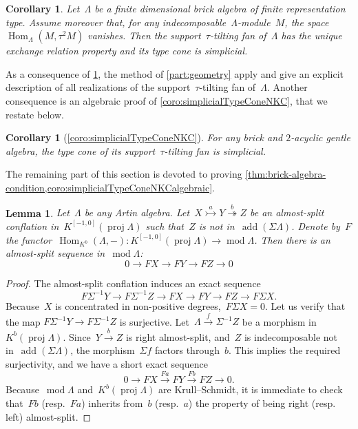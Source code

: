 \documentclass{amsart}
\newtheorem{corollary}[theorem]{Corollary}
\newtheorem{lemma}[theorem]{Lemma}
\theoremstyle{definition}
\newcommand{\Hom}[1]{\operatorname{Hom}_{#1}}
\newcommand{\susp}{\Sigma}
\newcommand{\add}{\operatorname{add}}
\newcommand{\MOD}{\operatorname{mod}}
\newcommand{\proj}{\operatorname{proj}}
\newcommand{\infl}{\rightarrowtail}
\newcommand{\defl}{\twoheadrightarrow}
\begin{document}
\begin{corollary}
\label{coro:silting simplicial}
Let~$\Lambda$ be a finite dimensional brick algebra of finite representation type.
Assume moreover that, for any indecomposable~$\Lambda$-module~$M$, the space~$\Hom{\Lambda}(M, \tau^2 M)$ vanishes.
Then the support~$\tau$-tilting fan of~$\Lambda$ has the unique exchange relation property and its type cone is simplicial.
\end{corollary}

As a consequence of \cref{coro:silting simplicial}, the method of \cref{part:geometry} apply and give an explicit description of all realizations of the support~$\tau$-tilting fan of~$\Lambda$.
Another consequence is an algebraic proof of \cref{coro:simplicialTypeConeNKC}, that we restate below.

\begin{corollary}[\cref{coro:simplicialTypeConeNKC}]
\label{coro:simplicialTypeConeNKCalgebraic}
For any brick and $2$-acyclic gentle algebra, the type cone of its support~$\tau$-tilting fan is simplicial.
\end{corollary}

The remaining part of this section is devoted to proving \cref{thm:brick-algebra-condition,coro:simplicialTypeConeNKCalgebraic}.

\begin{lemma}
\label{lem:AR-conflations-and-sequences}
Let~$\Lambda$ be any Artin algebra. Let~$X\overset{a}{\infl} Y \overset{b}{\defl} Z$ be an almost-split conflation in~$K^{[-1,0]}(\proj \Lambda)$ such that~$Z$ is not in~$\add(\susp \Lambda)$. Denote by~$F$ the functor~$\Hom{K^b}(\Lambda, -):K^{[-1,0]}(\proj \Lambda) \to \MOD \Lambda$. Then there is an almost-split sequence in~$\MOD\Lambda$:
\[
0\to FX\to FY \to FZ \to 0
\]
\end{lemma}

\begin{proof}
The almost-split conflation induces an exact sequence
\[
F\susp^{-1}Y\to F\susp^{-1}Z \to FX \to FY\to FZ\to F\susp X.
\]
Because~$X$ is concentrated in non-positive degrees,~$F\susp X=0$.
Let us verify that the map ${F\susp^{-1}Y\to F\susp^{-1}Z}$ is surjective.
Let~$\Lambda \xrightarrow{f} \susp^{-1} Z$ be a morphism in~$K^b(\proj \Lambda)$.
Since~$Y\overset{b}{\to} Z$ is right almost-split, and~$Z$ is indecomposable not in~$\add(\susp\Lambda)$, the morphism~$\susp f$ factors through~$b$.
This implies the required surjectivity, and we have a short exact sequence
\[
 0 \to FX \xrightarrow{Fa} FY\xrightarrow{Fb} FZ\to 0.
\]
Because~$\MOD\Lambda$ and~$K^b(\proj \Lambda)$ are Krull--Schmidt, it is immediate to check that~$Fb$ (resp.~$Fa$) inherits from~$b$ (resp.~$a$) the property of being right (resp. left) almost-split.
\end{proof}
\end{document}
